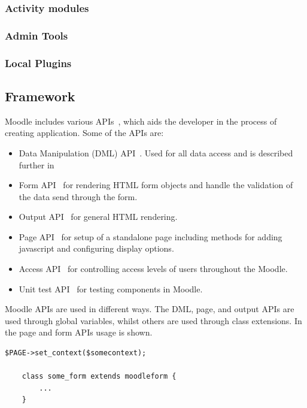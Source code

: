 	\subsubsection{Activity modules}





	\subsubsection{Admin Tools}






	\subsubsection{Local Plugins}




\subsection{Framework}
  Moodle includes various APIs~\cite{moodlecoreapis}, which aids the developer in the process of creating application. Some of the APIs are:
	
	\begin{itemize}
		\item Data Manipulation (DML) API~\cite{moodledml}. Used for all data access and is described further in 
		\item Form API~\cite{moodleformapi} for rendering HTML form objects and handle the validation of the data send through the form. 
		\item Output API~\cite{moodleoutputapi} for general HTML rendering.
		\item Page API~\cite{moodlepageapi} for setup of a standalone page including methods for adding javascript and configuring display options. 
		\item Access API~\cite{moodleaccessapi} for controlling access levels of users throughout the Moodle. 
		\item Unit test API~\cite{moodleunittestapi} for testing components in Moodle. 
	\end{itemize}
	Moodle APIs are used in different ways. The DML, page, and output APIs are used through global variables, whilst others are used through class extensions. In~ the page and form APIs usage is shown.
	\begin{lstlisting}[style=phpCode, caption=\myCaption{Example of the Page and form APIs in Moodle}, label=moodleapiusage]
	$PAGE->set_context($somecontext);
	
	class some_form extends moodleform {
		...
	}
	\end{lstlisting}

